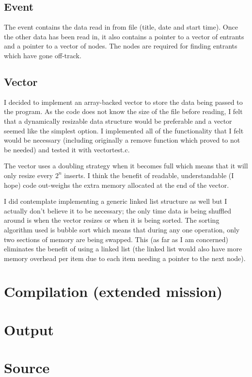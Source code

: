 \documentclass[a4paper, twoside]{article}
\begin{document}
\subsection{Event}
The event contains the data read in from file (title, date and start time).
Once the other data has been read in, it also contains a pointer to a vector
of entrants and a pointer to a vector of nodes. The nodes are required for
finding entrants which have gone off-track.

\subsection{Vector}
I decided to implement an array-backed vector to store the data being passed to
the program. As the code does not know the size of the file before reading, I
felt that a dynamically resizable data structure would be preferable and a
vector seemed like the simplest option. I implemented all of the functionality
that I felt would be necessary (including originally a remove function which
proved to not be needed) and tested it with vectortest.c.

The vector uses a doubling strategy when it becomes full which means that it
will only resize every $2^n$ inserts. I think the benefit of readable,
understandable (I hope) code out-weighs the extra memory allocated at the
end of the vector.

I did contemplate implementing a generic linked list structure as well but I
actually don't believe it to be necessary; the only time data is being shuffled
around is when the vector resizes or when it is being sorted. The sorting
algorithm used is bubble sort which means that during any one operation, only
two sections of memory are being swapped. This (as far as I am concerned)
eliminates the benefit of using a linked list (the linked list would also have
more memory overhead per item due to each item needing a pointer to the next
node).

\newpage
\section{Compilation (extended mission)}


\newpage
\section{Output}

\newpage
\section{Source}
\end{document}
